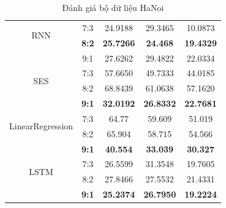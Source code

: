 \documentclass[conference]{IEEEtran}
\begin{document}
\begin{table}[H]
\begin{tabular}{|c|c|c|c|c|}
        \hline
        \multirow{2}{*}{RNN}                  & 7:3              & 24.9188 & 29.3465        & 10.0873 \\ & \textbf{8:2} & \textbf{25.7266} & \textbf{24.468} & \textbf{19.4329} \\ & 9:1 &  27.6262 &	29.4822 & 	22.0334 \\
        \hline
        \multirow{2}{*}{SES}                  & 7:3              & 57.6650 & 49.7333        & 44.0185 \\ & 8:2 & 68.8439 &  61.0638 &  57.1620 \\ & \textbf{9:1} & \textbf{32.0192} & \textbf{26.8332} & \textbf{22.7681}\\
        \hline
        \multirow{2}{*}{LinearRegression}     & 7:3              & 64.77   & 59.609         & 51.019  \\ & 8:2 & 65.904 &  58.715 & 54.566 \\ & \textbf{9:1} & \textbf{40.554} & \textbf{33.039} & \textbf{30.327}\\
        \hline
        \multirow{2}{*}{LSTM}                 & 7:3              & 26.5599 & 31.3548        & 19.7605 \\ & 8:2 & 27.8466 &  27.5532 &  21.4331 \\ & \textbf{9:1} & \textbf{25.2374} & \textbf{26.7950} & \textbf{19.2224}\\
        \hline
    \end{tabular}
    \vspace{5px}
    \caption{Đánh giá bộ dữ liệu HaNoi}
    \label{mbbresult}
\end{table}
\end{document}
